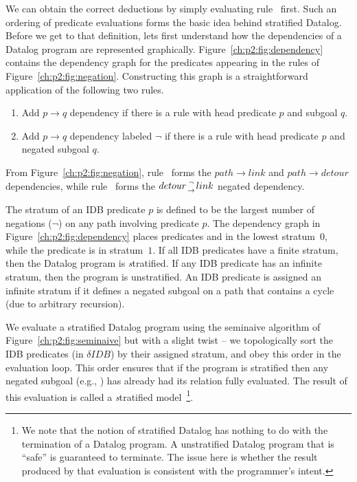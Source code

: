 We can obtain the correct deductions by simply evaluating rule~ first.
Such an ordering of predicate evaluations forms the basic idea behind
stratified Datalog.  Before we get to that definition, lets first understand
how the dependencies of a Datalog program are represented graphically.
Figure~\ref{ch:p2:fig:dependency} contains the dependency graph for the predicates
appearing in the rules of Figure~\ref{ch:p2:fig:negation}. Constructing this graph
is a straightforward application of the following two rules.
\begin{enumerate}
  \ssp
  \item Add $p \rightarrow q$ dependency if there is a rule with head predicate $p$ and subgoal $q$.
  \item Add $p \rightarrow q$ dependency labeled $\neg$ if there is a rule with head predicate $p$ and negated subgoal $q$.
\end{enumerate}
From Figure~\ref{ch:p2:fig:negation}, rule~ forms the $path \rightarrow
link$ and $path \rightarrow detour$ dependencies, while rule~ forms the
$detour {\neg \atop \rightarrow} link$ negated dependency. 

The stratum of an IDB predicate $p$ is defined to be the largest number of
negations ($\neg$) on any path involving predicate $p$.  The dependency graph
in Figure~\ref{ch:p2:fig:dependency} places predicates  and
 in the lowest stratum~$0$, while the  predicate is in
stratum~$1$.  If all IDB predicates have a finite stratum, then the Datalog
program is {\emph stratified}.  If any IDB predicate has an infinite stratum,
then the program is unstratified.  An IDB predicate is assigned an infinite
stratum if it defines a negated subgoal on a path that contains a cycle (due
to arbitrary recursion).

We evaluate a stratified Datalog program using the seminaive algorithm of
Figure~\ref{ch:p2:fig:seminaive} but with a slight twist -- we topologically
sort the IDB predicates (in $\delta IDB$) by their assigned stratum, and obey
this order in the evaluation loop.  This order ensures that if the program is
stratified then any negated subgoal (e.g., ) has already had its
relation fully evaluated.  The result of this evaluation is called a {\emph
stratified model}~\footnote{We note that the notion of stratified Datalog
has nothing to do with the termination of a Datalog program.  A unstratified
Datalog program that is ``safe'' is guaranteed to terminate.  The issue
here is whether the result produced by that evaluation is consistent with
the programmer's intent.}.


